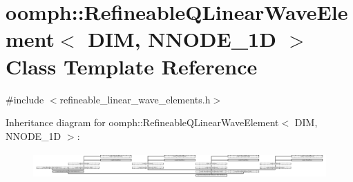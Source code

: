\hypertarget{classoomph_1_1RefineableQLinearWaveElement}{}\section{oomph\+:\+:Refineable\+Q\+Linear\+Wave\+Element$<$ D\+IM, N\+N\+O\+D\+E\+\_\+1D $>$ Class Template Reference}
\label{classoomph_1_1RefineableQLinearWaveElement}


{\ttfamily \#include $<$refineable\+\_\+linear\+\_\+wave\+\_\+elements.\+h$>$}

Inheritance diagram for oomph\+:\+:Refineable\+Q\+Linear\+Wave\+Element$<$ D\+IM, N\+N\+O\+D\+E\+\_\+1D $>$\+:\begin{figure}[H]
\begin{center}
\leavevmode
\includegraphics[height=1.011743cm]{classoomph_1_1RefineableQLinearWaveElement}
\end{center}
\end{figure}
